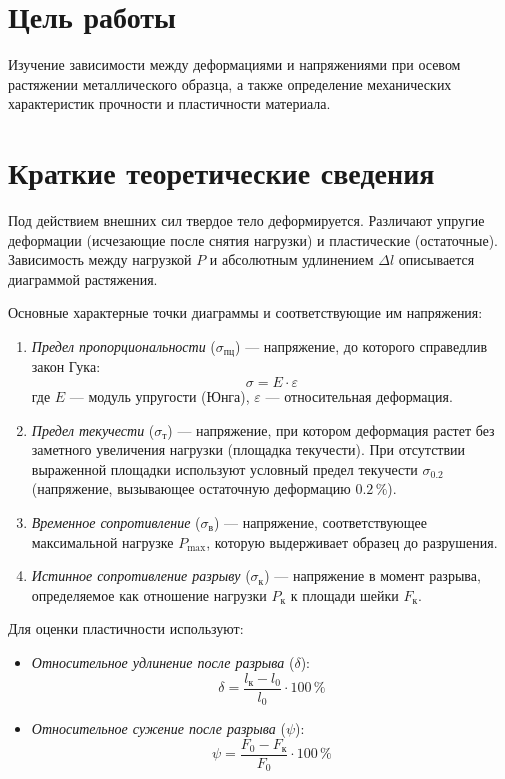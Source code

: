 \section*{Цель работы}
Изучение зависимости между деформациями и напряжениями при осевом растяжении металлического образца, а также определение механических характеристик прочности и пластичности материала.

\section*{Краткие теоретические сведения}
Под действием внешних сил твердое тело деформируется. Различают упругие деформации (исчезающие после снятия нагрузки) и пластические (остаточные).
Зависимость между нагрузкой $P$ и абсолютным удлинением $\Delta l$ описывается диаграммой растяжения.

Основные характерные точки диаграммы и соответствующие им напряжения:
\begin{enumerate}
    \item \textit{Предел пропорциональности} ($\sigma_{\text{пц}}$) — напряжение, до которого справедлив закон Гука:
    $$ \sigma = E \cdot \varepsilon $$
    где $E$ — модуль упругости (Юнга), $\varepsilon$ — относительная деформация.
    \item \textit{Предел текучести} ($\sigma_{\text{т}}$) — напряжение, при котором деформация растет без заметного увеличения нагрузки (площадка текучести). При отсутствии выраженной площадки используют условный предел текучести $\sigma_{0.2}$ (напряжение, вызывающее остаточную деформацию $0.2\,\%$).
    \item \textit{Временное сопротивление} ($\sigma_{\text{в}}$) — напряжение, соответствующее максимальной нагрузке $P_{\max}$, которую выдерживает образец до разрушения.
    \item \textit{Истинное сопротивление разрыву} ($\sigma_{\text{к}}$) — напряжение в момент разрыва, определяемое как отношение нагрузки $P_{\text{к}}$ к площади шейки $F_{\text{к}}$.
\end{enumerate}

Для оценки пластичности используют:
\begin{itemize}
    \item \textit{Относительное удлинение после разрыва} ($\delta$):
    $$ \delta = \frac{l_{\text{к}} - l_0}{l_0} \cdot 100\,\% $$
    \item \textit{Относительное сужение после разрыва} ($\psi$):
    $$ \psi = \frac{F_0 - F_{\text{к}}}{F_0} \cdot 100\,\% $$
\end{itemize}

